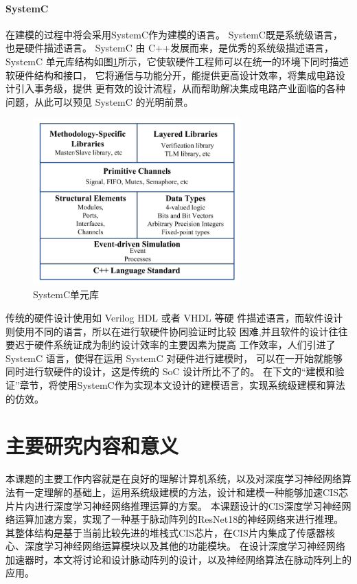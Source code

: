 \paragraph{SystemC}
在建模的过程中将会采用SystemC作为建模的语言。
SystemC既是系统级语言，也是硬件描述语言\cite{2008SystemC}。
SystemC 由 C++发展而来，是优秀的系统级描述语言，SystemC 单元库结构如图\ref{fig:systemc_libs}所示，它使软硬件工程师可以在统一的环境下同时描述软硬件结构和接口， 它将通信与功能分开，能提供更高设计效率，将集成电路设计引入事务级，提供 更有效的设计流程，从而帮助解决集成电路产业面临的各种问题，从此可以预见 SystemC 的光明前景\cite{SWZ20131553B}。

\begin{figure}[htbp]
    \centering
    \includegraphics[width=8cm]{figures/systemc_libs.png}
    \caption{SystemC单元库}
    \label{fig:systemc_libs}
\end{figure} 
传统的硬件设计使用如 Verilog HDL 或者 VHDL 等硬 件描述语言，而软件设计则使用不同的语言，所以在进行软硬件协同验证时比较 困难,并且软件的设计往往要迟于硬件系统证成为制约设计效率的主要因素为提高 工作效率，人们引进了 SystemC 语言，使得在运用 SystemC 对硬件进行建模时， 可以在一开始就能够同时进行软硬件的设计，这是传统的 SoC 设计所比不了的\cite{2010Real}。
在下文的“建模和验证”章节，将使用SystemC作为实现本文设计的建模语言，实现系统级建模和算法的仿效。

\section{主要研究内容和意义}

本课题的主要工作内容就是在良好的理解计算机系统，以及对深度学习神经网络算法有一定理解的基础上，运用系统级建模的方法，设计和建模一种能够加速CIS芯片片内进行深度学习神经网络推理运算的方案。  
本课题设计的CIS深度学习神经网络运算加速方案，实现了一种基于脉动阵列的ResNet18的神经网络来进行推理。
其整体结构是基于当前比较先进的堆栈式CIS芯片，在CIS片内集成了传感器核心、深度学习神经网络运算模块以及其他的功能模块。
在设计深度学习神经网络加速器时，本文将讨论和设计脉动阵列的设计，以及神经网络算法在脉动阵列上的应用。    


